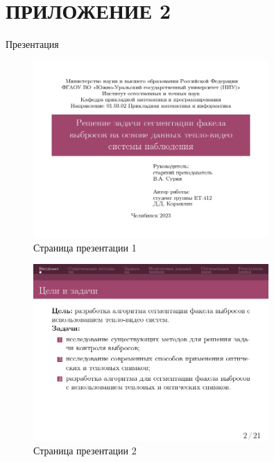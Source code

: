 \documentclass[14pt, a4paper]{extreport}
\begin{document}
\chapter* {ПРИЛОЖЕНИЕ 2}
	\renewcommand{\thefigure}{П2.\arabic{figure}}
	\vspace{-0.5cm}
	\hspace{5.4cm} Презентация
	\begin{figure}[h!]
		\centering
		\includegraphics[width = 0.8\textwidth]{image/процентовка1_page-0001}	
		\caption{Страница презентации 1}
	\end{figure}
	\begin{figure}[h!]
		\centering
		\includegraphics[width = 0.8\textwidth]{image/процентовка1_page-0002}	
		\caption{Страница презентации 2}
	\end{figure}
\end{document}
